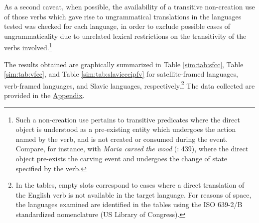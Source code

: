 \documentclass[output=paper,colorlinks,citecolor=brown]{langscibook}
\begin{document}
As a second caveat, when possible, the availability of a transitive non-creation use of those verbs which gave rise to ungrammatical translations in the languages tested was checked for each language, in order to exclude possible cases of ungrammaticality due to unrelated lexical restrictions on the transitivity of the verbs involved.\footnote{Such a non-creation use pertains to transitive predicates where the direct object is understood as a pre-existing entity which undergoes the action named by the verb, and is not created or consumed during the event. Compare, for instance,  with \textit{Maria carved the wood} (\citealt{FolliAndHarley2020}: 439), where the direct object pre-exists the carving event and undergoes the change of state specified by the verb.}

The results obtained are graphically summarized in Table \ref{sim:tab:sfcc}, Table \ref{sim:tab:vfcc}, and Table \ref{sim:tab:slavicccipfv} for satellite-framed languages, verb-framed languages, and Slavic languages, respectively.\footnote{In the tables, empty slots correspond to cases where a direct translation of the English verb is not available in the target language. For reasons of space, the languages examined are identified in the tables using the ISO 639-2/B standardized nomenclature (US Library of Congress).} The data collected %
are provided in the \href{https://osf.io/5a8nw?view_only=ab1508753f9f4c25ba30358819e831b2}{Appendix}.
\end{document}
